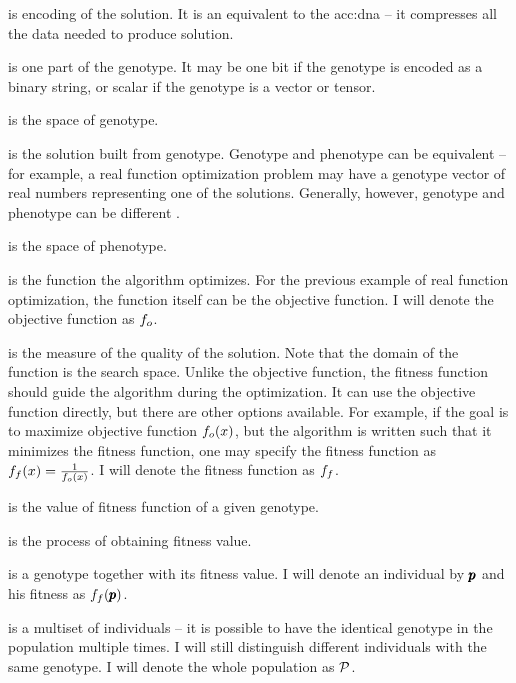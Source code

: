  is encoding of the solution. It is an equivalent to the \acrshort{acc:dna} -- it compresses all the data needed to produce solution.

 is one part of the genotype. It may be one bit if the genotype is encoded as a binary string, or scalar if the genotype is a vector or tensor. 

 is the space of genotype.

 is the solution built from genotype. Genotype and phenotype can be equivalent -- for example, a real function optimization problem may have a genotype vector of real numbers representing one of the solutions. Generally, however, genotype and phenotype can be different \citep{GeneticAlgorithmEssentials}.

 is the space of phenotype.

 is the function the algorithm optimizes. For the previous example of real function optimization, the function itself can be the objective function. I will denote the objective function as $f_o$.

 is the measure of the quality of the solution. Note that the domain of the function is the search space. Unlike the objective function, the fitness function should guide the algorithm during the optimization. It can use the objective function directly, but there are other options available. For example, if the goal is to maximize objective function $f_o(x)$, but the algorithm is written such that it minimizes the fitness function, one may specify the fitness function as $f_f(x)=\frac{1}{f_o(x)}$. I will denote the fitness function as $f_f$.

 is the value of fitness function of a given genotype. 

 is the process of obtaining fitness value.

 is a genotype together with its fitness value. I will denote an individual by $\pmb{p}$ and his fitness as $f_f(\pmb{p})$.

 is a multiset of individuals -- it is possible to have the identical genotype in the population multiple times. I will still distinguish different individuals with the same genotype. I will denote the whole population as $\mathcal{P}$.

